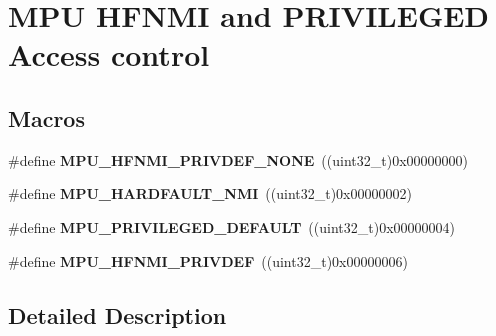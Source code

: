 \hypertarget{group___c_o_r_t_e_x___m_p_u___h_f_n_m_i___p_r_i_v_d_e_f___control}{}\section{M\+PU H\+F\+N\+MI and P\+R\+I\+V\+I\+L\+E\+G\+ED Access control}
\label{group___c_o_r_t_e_x___m_p_u___h_f_n_m_i___p_r_i_v_d_e_f___control}
\subsection*{Macros}
\begin{DoxyCompactItemize}
\item 
\#define {\bfseries M\+P\+U\+\_\+\+H\+F\+N\+M\+I\+\_\+\+P\+R\+I\+V\+D\+E\+F\+\_\+\+N\+O\+NE}~((uint32\+\_\+t)0x00000000)\hypertarget{group___c_o_r_t_e_x___m_p_u___h_f_n_m_i___p_r_i_v_d_e_f___control_ga4139151bb1f1d4230704e0e5ec8843a3}{}\label{group___c_o_r_t_e_x___m_p_u___h_f_n_m_i___p_r_i_v_d_e_f___control_ga4139151bb1f1d4230704e0e5ec8843a3}

\item 
\#define {\bfseries M\+P\+U\+\_\+\+H\+A\+R\+D\+F\+A\+U\+L\+T\+\_\+\+N\+MI}~((uint32\+\_\+t)0x00000002)\hypertarget{group___c_o_r_t_e_x___m_p_u___h_f_n_m_i___p_r_i_v_d_e_f___control_gac18d69bf469c4eccb3847c1ebb9c6e74}{}\label{group___c_o_r_t_e_x___m_p_u___h_f_n_m_i___p_r_i_v_d_e_f___control_gac18d69bf469c4eccb3847c1ebb9c6e74}

\item 
\#define {\bfseries M\+P\+U\+\_\+\+P\+R\+I\+V\+I\+L\+E\+G\+E\+D\+\_\+\+D\+E\+F\+A\+U\+LT}~((uint32\+\_\+t)0x00000004)\hypertarget{group___c_o_r_t_e_x___m_p_u___h_f_n_m_i___p_r_i_v_d_e_f___control_ga54e25545ddf2d600e3570e863cee543b}{}\label{group___c_o_r_t_e_x___m_p_u___h_f_n_m_i___p_r_i_v_d_e_f___control_ga54e25545ddf2d600e3570e863cee543b}

\item 
\#define {\bfseries M\+P\+U\+\_\+\+H\+F\+N\+M\+I\+\_\+\+P\+R\+I\+V\+D\+EF}~((uint32\+\_\+t)0x00000006)\hypertarget{group___c_o_r_t_e_x___m_p_u___h_f_n_m_i___p_r_i_v_d_e_f___control_gaf75c4f6d895b7ed8b238f4330cf268e1}{}\label{group___c_o_r_t_e_x___m_p_u___h_f_n_m_i___p_r_i_v_d_e_f___control_gaf75c4f6d895b7ed8b238f4330cf268e1}

\end{DoxyCompactItemize}


\subsection{Detailed Description}
